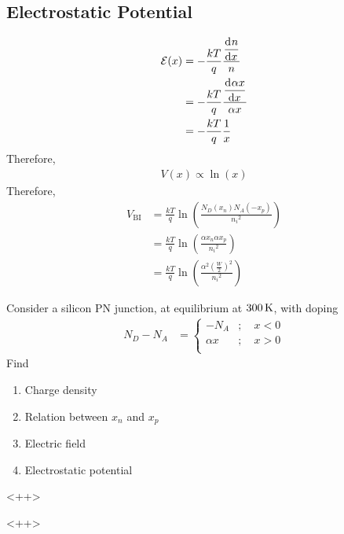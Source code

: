 \documentclass[titlepage, fleqn, a4paper, 12pt, twoside]{article}
\theoremstyle{definition}
\theoremstyle{theorem}
\begin{document}
\subsection{Electrostatic Potential}

\begin{align*}
	\mathcal{E}(x) & = -\frac{k T}{q} \frac{\dod{n}{x}}{n}               \\
                       & = -\frac{k T}{q} \frac{\dod{\alpha x}{x}}{\alpha x} \\
                       & = -\frac{k T}{q} \frac{1}{x}
\end{align*}
Therefore,
\begin{align*}
	V(x) \propto \ln(x)
\end{align*}
Therefore,
\begin{align*}
	V_{\text{BI}} & = \frac{k T}{q} \ln\left( \frac{N_D(x_n) N_A(-x_p)}{{n_i}^2} \right)    \\
                      & = \frac{k T}{q} \ln\left( \frac{\alpha x_n \alpha x_p}{{n_i}^2} \right) \\
                      & = \frac{k T}{q} \ln\left( \frac{\alpha^2 \left( \frac{W}{2} \right)^2}{{n_i}^2} \right)
\end{align*}

\begin{question}
	Consider a silicon PN junction, at equilibrium at $300 \kelvin$, with doping
	\begin{align*}
		N_D - N_A &=
			\begin{cases}
				-N_A     & ;\quad x < 0 \\
				\alpha x & ;\quad x > 0 \\
			\end{cases}
	\end{align*}
	Find
	\begin{enumerate}
		\item Charge density
		\item Relation between $x_n$ and $x_p$
		\item Electric field
		\item Electrostatic potential
	\end{enumerate}<++>
\end{question}<++>
\end{document}
